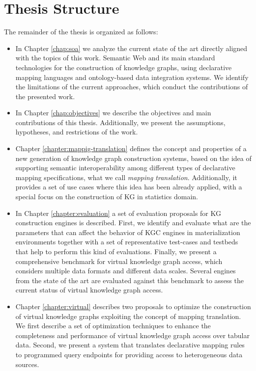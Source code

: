\section{Thesis Structure}
\label{sec:thesisstructure}
The remainder of the thesis is organized as follows:
\begin{itemize}
    \item In Chapter \ref{chap:soa} we analyze the current state of the art directly aligned with the topics of this work. Semantic Web and its main standard technologies for the construction of knowledge graphs, using declarative mapping languages and ontology-based data integration systems. We identify the limitations of the current approaches, which conduct the contributions of the presented work.
    \item In Chapter \ref{chap:objectives} we describe the objectives and main contributions of this thesis. Additionally, we present the assumptions, hypotheses, and restrictions of the work.
    \item Chapter \ref{chapter:mappig-translation} defines the concept and properties of a new generation of knowledge graph construction systems, based on the idea of supporting semantic interoperability among different types of declarative mapping specifications, what we call \textit{mapping translation}. Additionally, it provides a set of use cases where this idea has been already applied, with a special focus on the construction of KG in statistics domain.
    \item In Chapter \ref{chapter:evaluation} a set of evaluation proposals for KG construction engines is described. First, we identify and evaluate what are the parameters that can affect the behavior of KGC engines in materialization environments together with a set of representative test-cases and testbeds that help to perform this kind of evaluations. Finally, we present a comprehensive benchmark for virtual knowledge graph access, which considers multiple data formats and different data scales. Several engines from the state of the art are evaluated against this benchmark to assess the current status of virtual knowledge graph access. 
    \item Chapter \ref{chapter:virtual} describes two proposals to optimize the construction of virtual knowledge graphs exploiting the concept of mapping translation. We first describe a set of optimization techniques to enhance the completeness and performance of virtual knowledge graph access over tabular data. Second, we present a system that translates declarative mapping rules to programmed query endpoints for providing access to heterogeneous data sources.

\end{itemize}
